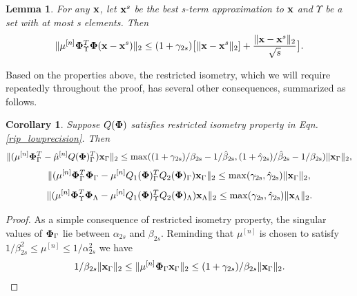 \documentclass{article}
\newtheorem{lemma}{Lemma}
\newtheorem{proof}{Proof}
\newtheorem{corollary}{Corollary}
\begin{document}
\begin{lemma} \label{residual_lemma}
{\rm{\cite{blumensath2010niht}}}
For any ${\bf x}$, let ${\bf x}^s$ be the best s-term approximation to ${\bf x}$ and $\Upsilon$ be a set with at most s elements. Then
\begin{equation}\label{residual_x_bound}
\|\mu^{[n]}{\bf \Phi}^T_{\Upsilon} {\bf \Phi} ({\bf x}-{\bf x}^s)\|_2 \leq (1+\gamma_{2s})\big [\|{\bf x}-{\bf x}^s\|_2 ]+ \frac{\|{\bf x}-{\bf x}^s\|_2}{\sqrt{s}}\big].
\end{equation}
\end{lemma}
Based on the properties above, the restricted isometry, which we will require repeatedly throughout the proof, has several other consequences, summarized as follows.

\begin{corollary}\label{corollary_auxiliary_results}
Suppose $Q(\boldsymbol{{\bf \Phi}})$ satisfies restricted isometry property in Eqn. \ref{rip_lowprecision}. Then
\begin{equation}\label{mu_phi}
    \| ({\mu}^{[n]}{\bf {\bf \Phi}}_{\Gamma}^T-\hat{\mu}^{[n]}Q({\bf {\bf \Phi}})_{\Gamma}^T){\bf x}_{\Gamma}\|_2 \leq \rm{max}(({1+\gamma_{2s}})/{\beta_{2s}}-{1}/{\hat{\beta}_{2s}}, ({1+\hat{\gamma}_{2s}})/{\hat{\beta}_{2s}}-{1}/{\beta_{2s}})\| {\bf x}_{\Gamma}\|_2,
\end{equation} 
\begin{equation}\label{mu_phi2}
    \|( \mu^{[n]}{\bf \Phi}_{\Gamma}^T\boldsymbol{\Phi}_{\Gamma} - \mu^{[n]}Q_1(\boldsymbol{\Phi})_{\Gamma}^TQ_2(\boldsymbol{\Phi})_{\Gamma}){\bf x}_{\Gamma}\|_2 \leq \rm{max}(\gamma_{2s}, \hat{\gamma}_{2s})\| {\bf x}_{\Gamma}\|_2,
\end{equation}
\begin{equation}\label{mu_phi2_diff}
    \| (\mu^{[n]}\boldsymbol{\Phi}_{\Upsilon}^T\boldsymbol{\Phi}_{\Lambda} - \mu^{[n]}Q_1(\boldsymbol{\Phi})_{\Upsilon}^TQ_2(\boldsymbol{\Phi})_{\Lambda}){\bf x}_{\Lambda}\|_2 \leq \rm{max}(\gamma_{2s}, \hat{\gamma}_{2s})\| {\bf x}_{\Lambda}\|_2.
\end{equation}
\end{corollary}
\begin{proof}
As a simple consequence of restricted isometry property, the singular values of ${\bf \Phi}_{\Gamma}$ lie between $\alpha_{2s}$ and $\beta_{2s}$. Reminding that $\mu^{[n]}$ is chosen to satisfy $1/\beta^2_{2s}\leq \mu^{[n]}\leq 1/\alpha^2_{2s}$ we have
\begin{equation}
\begin{aligned}
   1/\beta_{2s} \| {\bf x}_{\Gamma}\|_2\leq \|{\mu}^{[n]}{\bf {\bf \Phi}}_{\Gamma} {\bf x}_{\Gamma}\|_2\leq (1+\gamma_{2s})/\beta_{2s}\| {\bf x}_{\Gamma}\|_2.
\end{aligned}
\end{equation}
\end{proof}
\end{document}
